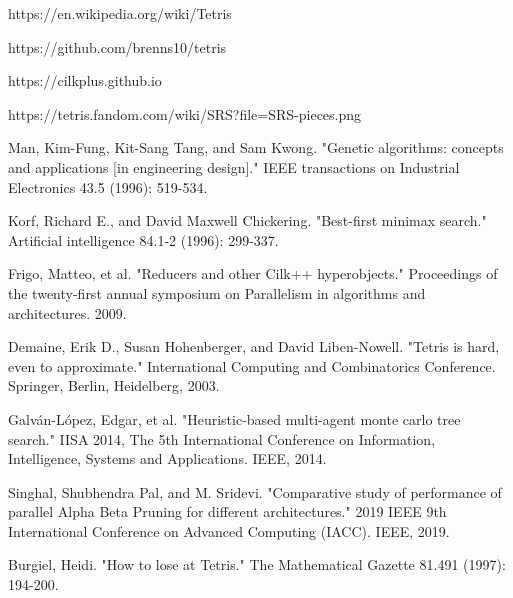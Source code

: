 \vspace{0.5em}
\begin{thebibliography}{99}

\label{ref:tetrisGame} https://en.wikipedia.org/wiki/Tetris

\label{ref:tetrisRepo} https://github.com/brenns10/tetris

\label{ref:CilkPlus} https://cilkplus.github.io

\label{ref:tetrisImage} https://tetris.fandom.com/wiki/SRS?file=SRS-pieces.png

\label{ref:Genetic} Man, Kim-Fung, Kit-Sang Tang, and Sam Kwong. "Genetic algorithms: concepts and applications [in engineering design]." IEEE transactions on Industrial Electronics 43.5 (1996): 519-534.

\label{ref:Minimax} Korf, Richard E., and David Maxwell Chickering. "Best-first minimax search." Artificial intelligence 84.1-2 (1996): 299-337.

\label{ref:CilkReducer} Frigo, Matteo, et al. "Reducers and other Cilk++ hyperobjects." Proceedings of the twenty-first annual symposium on Parallelism in algorithms and architectures. 2009.

\label{ref:TetrisHard} Demaine, Erik D., Susan Hohenberger, and David Liben-Nowell. "Tetris is hard, even to approximate." International Computing and Combinatorics Conference. Springer, Berlin, Heidelberg, 2003.

\label{ref:MonteCarlo} Galván-López, Edgar, et al. "Heuristic-based multi-agent monte carlo tree search." IISA 2014, The 5th International Conference on Information, Intelligence, Systems and Applications. IEEE, 2014.

\label{ref:AlphaBeta} Singhal, Shubhendra Pal, and M. Sridevi. "Comparative study of performance of parallel Alpha Beta Pruning for different architectures." 2019 IEEE 9th International Conference on Advanced Computing (IACC). IEEE, 2019.

\label{ref:Burgiel} Burgiel, Heidi. "How to lose at Tetris." The Mathematical Gazette 81.491 (1997): 194-200.

\begin{comment}


\end{comment}
\end{thebibliography}
